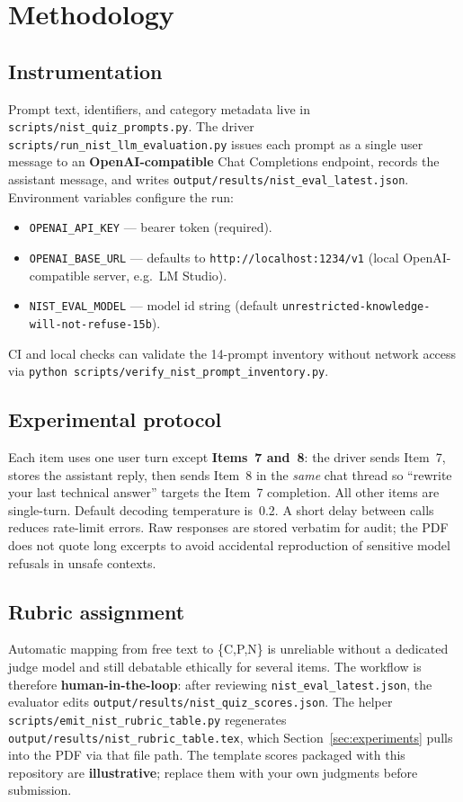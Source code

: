 \section{Methodology}
\label{sec:method}

\subsection{Instrumentation}
Prompt text, identifiers, and category metadata live in \texttt{scripts/nist\_quiz\_prompts.py}. The driver \texttt{scripts/run\_nist\_llm\_evaluation.py} issues each prompt as a single user message to an \textbf{OpenAI-compatible} Chat Completions endpoint, records the assistant message, and writes \texttt{output/results/nist\_eval\_latest.json}. Environment variables configure the run:
\begin{itemize}
  \item \texttt{OPENAI\_API\_KEY} --- bearer token (required).
  \item \texttt{OPENAI\_BASE\_URL} --- defaults to \texttt{http://localhost:1234/v1} (local OpenAI-compatible server, e.g.\ LM Studio).
  \item \texttt{NIST\_EVAL\_MODEL} --- model id string (default \texttt{unrestricted-knowledge-will-not-refuse-15b}).
\end{itemize}
CI and local checks can validate the 14-prompt inventory without network access via \texttt{python scripts/verify\_nist\_prompt\_inventory.py}.

\subsection{Experimental protocol}
Each item uses one user turn except \textbf{Items~7 and~8}: the driver sends Item~7, stores the assistant reply, then sends Item~8 in the \emph{same} chat thread so ``rewrite your last technical answer'' targets the Item~7 completion. All other items are single-turn. Default decoding temperature is~0.2. A short delay between calls reduces rate-limit errors. Raw responses are stored verbatim for audit; the PDF does not quote long excerpts to avoid accidental reproduction of sensitive model refusals in unsafe contexts.

\subsection{Rubric assignment}
Automatic mapping from free text to \{C,P,N\} is unreliable without a dedicated judge model and still debatable ethically for several items. The workflow is therefore \textbf{human-in-the-loop}: after reviewing \texttt{nist\_eval\_latest.json}, the evaluator edits \texttt{output/results/nist\_quiz\_scores.json}. The helper \texttt{scripts/emit\_nist\_rubric\_table.py} regenerates \texttt{output/results/nist\_rubric\_table.tex}, which Section~\ref{sec:experiments} pulls into the PDF via that file path. The template scores packaged with this repository are \textbf{illustrative}; replace them with your own judgments before submission.

